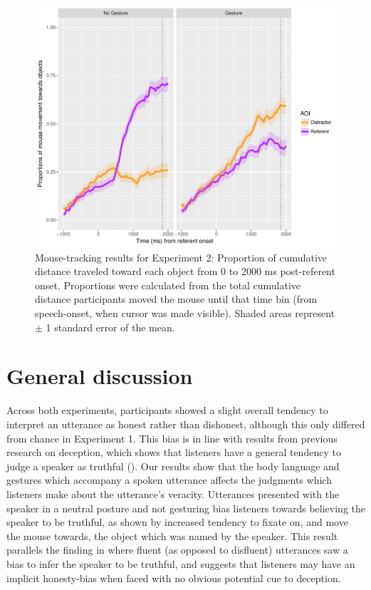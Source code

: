 \documentclass[a4paper,man,natbib]{apa6}
\begin{document}
\begin{figure}[Ht]
  \centering
	\includegraphics[width=\linewidth]{./img/e8_mouset.pdf}
  \caption{Mouse-tracking results for Experiment 2: Proportion of cumulative distance traveled toward each object from 0 to 2000 ms post-referent onset. Proportions were calculated from the total cumulative distance participants moved the mouse until that time bin (from speech-onset, when cursor was made visible). Shaded areas represent $\pm$ 1 standard error of the mean.}
  \label{fig:v2_mouse}
\end{figure}

\section{General discussion}
Across both experiments, participants showed a slight overall tendency to interpret an utterance as honest rather than dishonest, although this only differed from chance in Experiment 1. 
This bias is in line with results from previous research on deception, which shows that listeners have a general tendency to judge a speaker as truthful (\citealt{Vrij2000}). 
Our results show that the body language and gestures which accompany a spoken utterance affects the judgments which listeners make about the utterance's veracity.
Utterances presented with the speaker in a neutral posture and not gesturing bias listeners towards believing the speaker to be truthful, as shown by increased tendency to fixate on, and move the mouse towards, the object which was named by the speaker. 
This result parallels the finding in \citet{Loy2017} where fluent (as opposed to disfluent) utterances saw a bias to infer the speaker to be truthful, and suggests that listeners may have an implicit honesty-bias when faced with no obvious potential cue to deception. 
\end{document}
